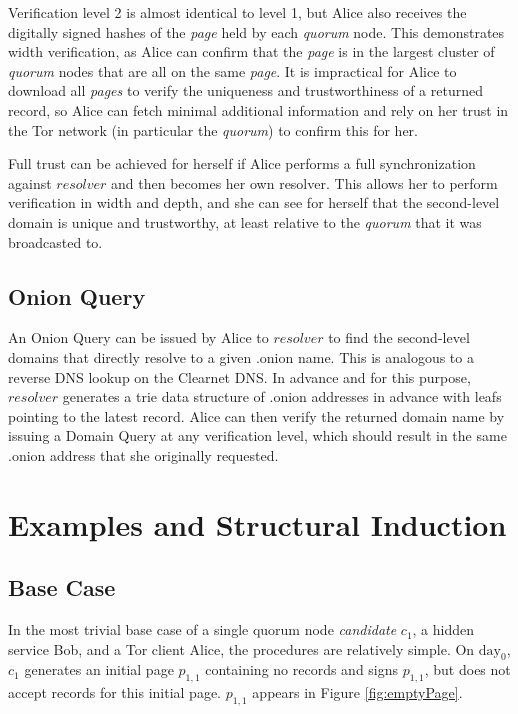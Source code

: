 Verification level 2 is almost identical to level 1, but Alice also receives the digitally signed hashes of the \emph{page} held by each \emph{quorum} node. This demonstrates width verification, as Alice can confirm that the \emph{page} is in the largest cluster of \emph{quorum} nodes that are all on the same \emph{page}. It is impractical for Alice to download all \emph{pages} to verify the uniqueness and trustworthiness of a returned record, so Alice can fetch minimal additional information and rely on her trust in the Tor network (in particular the \emph{quorum}) to confirm this for her.

Full trust can be achieved for herself if Alice performs a full synchronization against $ resolver $ and then becomes her own resolver. This allows her to perform verification in width and depth, and she can see for herself that the second-level domain is unique and trustworthy, at least relative to the \emph{quorum} that it was broadcasted to.

\subsection{Onion Query}

An Onion Query can be issued by Alice to $ resolver $ to find the second-level domains that directly resolve to a given .onion name. This is analogous to a reverse DNS lookup on the Clearnet DNS. In advance and for this purpose, $ resolver $ generates a trie data structure of .onion addresses in advance with leafs pointing to the latest record. Alice can then verify the returned domain name by issuing a Domain Query at any verification level, which should result in the same .onion address that she originally requested.

\section{Examples and Structural Induction}

\subsection{Base Case}

In the most trivial base case of a single quorum node \emph{candidate} $ c_{1} $, a hidden service Bob, and a Tor client Alice, the procedures are relatively simple. On $ \textrm{day}_{0} $, $ c_{1} $ generates an initial page $ p_{1,1} $ containing no records and signs $ p_{1,1} $, but does not accept records for this initial page. $ p_{1,1} $ appears in Figure \ref{fig:emptyPage}.

